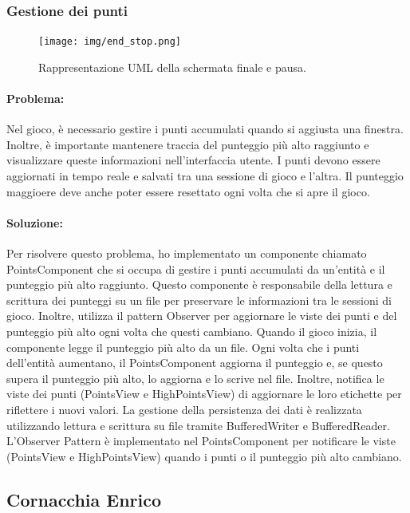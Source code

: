 \documentclass[a4paper,12pt]{report}
\begin{document}
\subsubsection{Gestione dei punti}

\begin{figure}[H]
\centering{}
\texttt{[image: img/end\_stop.png]}
\caption{Rappresentazione UML della schermata finale e pausa.}
\end{figure}

\paragraph{Problema:}
Nel gioco, è necessario gestire i punti accumulati quando si aggiusta una finestra. 
Inoltre, è importante mantenere traccia del punteggio più alto raggiunto e visualizzare queste informazioni nell'interfaccia utente. 
I punti devono essere aggiornati in tempo reale e salvati tra una sessione di gioco e l'altra. 
Il punteggio maggioere deve anche poter essere resettato ogni volta che si apre il gioco.

\paragraph{Soluzione:}
Per risolvere questo problema, ho implementato un componente chiamato PointsComponent che si occupa di gestire i punti accumulati da un'entità e il punteggio più alto raggiunto. 
Questo componente è responsabile della lettura e scrittura dei punteggi su un file per preservare le informazioni tra le sessioni di gioco. 
Inoltre, utilizza il pattern Observer per aggiornare le viste dei punti e del punteggio più alto ogni volta che questi cambiano. 
Quando il gioco inizia, il componente legge il punteggio più alto da un file. 
Ogni volta che i punti dell'entità aumentano, il PointsComponent aggiorna il punteggio e, se questo supera il punteggio più alto, lo aggiorna e lo scrive nel file. 
Inoltre, notifica le viste dei punti (PointsView e HighPointsView) di aggiornare le loro etichette per riflettere i nuovi valori. 
La gestione della persistenza dei dati è realizzata utilizzando lettura e scrittura su file tramite BufferedWriter e BufferedReader. 
L'Observer Pattern è implementato nel PointsComponent per notificare le viste (PointsView e HighPointsView) quando i punti o il punteggio più alto cambiano. 


\subsection{Cornacchia Enrico}
\end{document}

